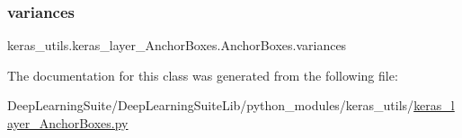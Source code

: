 \subsubsection{\texorpdfstring{variances}{variances}}
{\footnotesize\ttfamily keras\+\_\+utils.\+keras\+\_\+layer\+\_\+\+Anchor\+Boxes.\+Anchor\+Boxes.\+variances}



The documentation for this class was generated from the following file\+:\begin{DoxyCompactItemize}
\item 
Deep\+Learning\+Suite/\+Deep\+Learning\+Suite\+Lib/python\+\_\+modules/keras\+\_\+utils/\hyperlink{keras__layer___anchor_boxes_8py}{keras\+\_\+layer\+\_\+\+Anchor\+Boxes.\+py}\end{DoxyCompactItemize}
